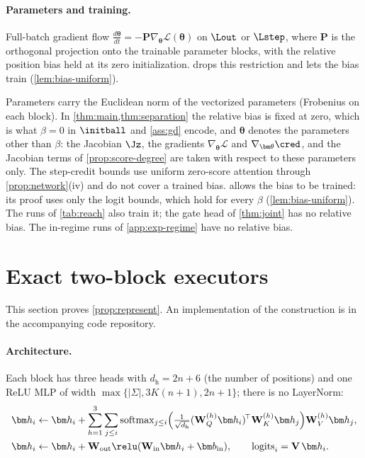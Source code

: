 \paragraph{Parameters and training.}

\begin{assumption}[Training]
\label{ass:gd}
Full-batch gradient flow $\tfrac{d\bm\theta}{dt}=-\mathbf P\nabla_{\bm\theta}\mathcal L(\bm\theta)$ on $\Lout$ or $\Lstep$, where $\mathbf P$ is the orthogonal projection onto
the trainable parameter blocks, with the relative
position bias held at its zero initialization.  drops this restriction and lets the bias train (\cref{lem:bias-uniform}).
\end{assumption}

\label{rem:norms}Parameters carry the Euclidean norm of the vectorized parameters (Frobenius on
each block). In \cref{thm:main,thm:separation} the relative bias is fixed at zero, which is what $\beta=0$ in $\initball$ and
\cref{ass:gd} encode, and $\bm\theta$ denotes the parameters other than $\beta$: the Jacobian $\Jz$, the gradients $\nabla_{\bm\theta}\mathcal L$ and
$\nabla_{\bm\theta}\cred$, and the Jacobian terms of \cref{prop:score-degree} are taken with respect to these parameters only. The step-credit bounds use uniform
zero-score attention through \cref{prop:network}(iv) and do not cover a trained bias.  allows the bias to be
trained: its proof uses only the logit bounds, which hold for every $\beta$ (\cref{lem:bias-uniform}). The runs of \cref{tab:reach} also train it; the gate head of \cref{thm:joint} has no relative bias. The in-regime runs of \cref{app:exp-regime} have no relative bias.


\section{Exact two-block executors}
\label{app:architectures}

This section proves \cref{prop:represent}. An implementation of the construction is in the accompanying code repository.

\paragraph{Architecture.}
\label{app:construction}
\label{app:model}
Each block has three heads with $d_{\mathrm h}=2n+6$ (the number of positions) and one ReLU MLP of width $\max\{|\Sigma|,3K(n+1),2n+1\}$;
there is no LayerNorm:
\begin{align*}
 \bm h_i&\leftarrow \bm h_i+\sum_{h=1}^{3}\sum_{j\le i}\operatorname{softmax}_{j\le i}\Bigl(\tfrac{1}{\sqrt{d_{\mathrm h}}}(\mathbf W^{(h)}_Q\bm h_i)^{\!\top}\mathbf W^{(h)}_K\bm h_j\Bigr)\mathbf W^{(h)}_V\bm h_j,\\
 \bm h_i&\leftarrow \bm h_i+\mathbf W_{\mathrm{out}}\relu(\mathbf W_{\mathrm{in}}\bm h_i+\bm b_{\mathrm{in}}),\qquad \mathrm{logits}_i=\mathbf V\,\bm h_i .
\end{align*}

